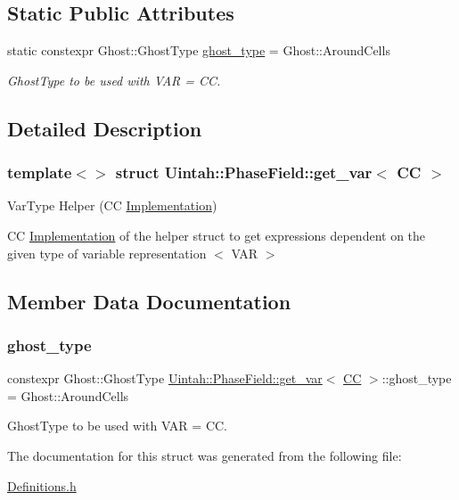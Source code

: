 \subsection*{Static Public Attributes}
\begin{DoxyCompactItemize}
\item 
static constexpr Ghost\+::\+Ghost\+Type \hyperlink{structUintah_1_1PhaseField_1_1get__var_3_01CC_01_4_a646950645048bc6d0827d877ae0a5912}{ghost\+\_\+type} = Ghost\+::\+Around\+Cells
\begin{DoxyCompactList}\small\item\em Ghost\+Type to be used with V\+AR = CC. \end{DoxyCompactList}\end{DoxyCompactItemize}


\subsection{Detailed Description}
\subsubsection*{template$<$$>$\newline
struct Uintah\+::\+Phase\+Field\+::get\+\_\+var$<$ C\+C $>$}

Var\+Type Helper (CC \hyperlink{classUintah_1_1PhaseField_1_1Implementation}{Implementation}) 

CC \hyperlink{classUintah_1_1PhaseField_1_1Implementation}{Implementation} of the helper struct to get expressions dependent on the given type of variable representation $<$ V\+AR $>$ 

\subsection{Member Data Documentation}
\mbox{\label{structUintah_1_1PhaseField_1_1get__var_3_01CC_01_4_a646950645048bc6d0827d877ae0a5912}} 
\subsubsection{\texorpdfstring{ghost\+\_\+type}{ghost\_type}}
{\footnotesize\ttfamily constexpr Ghost\+::\+Ghost\+Type \hyperlink{structUintah_1_1PhaseField_1_1get__var}{Uintah\+::\+Phase\+Field\+::get\+\_\+var}$<$ \hyperlink{namespaceUintah_1_1PhaseField_a33d355affda78a83f45755ba8388cedda22303704507d024d1d6508ed9859a85a}{CC} $>$\+::ghost\+\_\+type = Ghost\+::\+Around\+Cells\hspace{0.3cm}{\ttfamily [static]}}



Ghost\+Type to be used with V\+AR = CC. 



The documentation for this struct was generated from the following file\+:\begin{DoxyCompactItemize}
\item 
\hyperlink{Definitions_8h}{Definitions.\+h}\end{DoxyCompactItemize}
